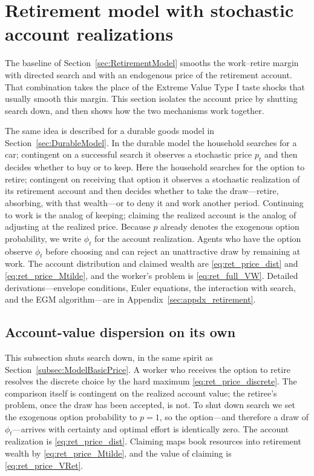 \section{Retirement model with stochastic account realizations}\label{sec:RetirementModelPrices}
The baseline of Section~\ref{sec:RetirementModel} smooths the work--retire margin with directed search and with an endogenous price of the retirement account. That combination takes the place of the Extreme Value Type I taste shocks that usually smooth this margin. This section isolates the account price by shutting search down, and then shows how the two mechanisms work together.

The same idea is described for a durable goods model in Section~\ref{sec:DurableModel}. In the durable model the household searches for a car; contingent on a successful search it observes a stochastic price $p_t$ and then decides whether to buy or to keep. Here the household searches for the option to retire; contingent on receiving that option it observes a stochastic realization of its retirement account and then decides whether to take the draw---retire, absorbing, with that wealth---or to deny it and work another period. Continuing to work is the analog of keeping; claiming the realized account is the analog of adjusting at the realized price. Because $p$ already denotes the exogenous option probability, we write $\phi_t$ for the account realization. Agents who have the option observe $\phi_t$ before choosing and can reject an unattractive draw by remaining at work. The account distribution and claimed wealth are \eqref{eq:ret_price_dist} and \eqref{eq:ret_price_Mtilde}, and the worker's problem is \eqref{eq:ret_full_VW}. Detailed derivations---envelope conditions, Euler equations, the interaction with search, and the EGM algorithm---are in Appendix~\ref{sec:appdx_retirement}.

\subsection{Account-value dispersion on its own}\label{subsec:RetirementPrices}
This subsection shuts search down, in the same spirit as Section~\ref{subsec:ModelBasicPrice}. A worker who receives the option to retire resolves the discrete choice by the hard maximum \eqref{eq:ret_price_discrete}. The comparison itself is contingent on the realized account value; the retiree's problem, once the draw has been accepted, is not. To shut down search we set the exogenous option probability to $p=1$, so the option---and therefore a draw of $\phi_t$---arrives with certainty and optimal effort is identically zero. The account realization is \eqref{eq:ret_price_dist}. Claiming maps book resources into retirement wealth by \eqref{eq:ret_price_Mtilde}, and the value of claiming is \eqref{eq:ret_price_VRet}.

